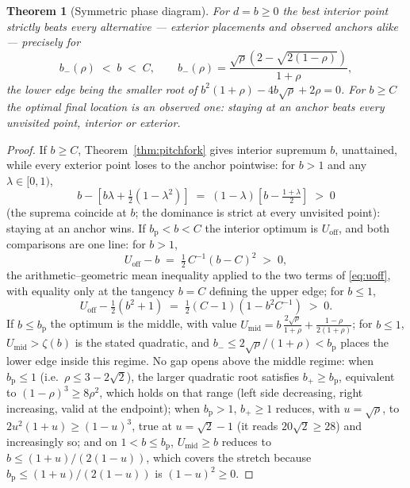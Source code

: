 \documentclass[11pt]{article}
\theoremstyle{itheads}
\newtheorem{theorem}{Theorem}
\begin{document}
\begin{theorem}[Symmetric phase diagram]\label{thm:boundary}
For $d=b\ge 0$ the best interior point strictly beats every
alternative --- exterior placements and observed anchors alike ---
precisely for
\begin{equation}\label{eq:region}
b_{-}(\rho) \;<\; b \;<\; C,
\qquad
b_{-}(\rho)=\frac{\sqrt{\rho}\left(2-\sqrt{2\left(1-\rho\right)}\right)}{1+\rho},
\end{equation}
the lower edge being the smaller root of
$b^{2}\left(1+\rho\right)-4b\sqrt{\rho}+2\rho=0$. For
$b\ge C$ the optimal final location is an \emph{observed}
one: staying at an anchor beats every unvisited point, interior or
exterior.
\end{theorem}

\begin{proof}
If $b\ge C$, Theorem~\ref{thm:pitchfork} gives interior
supremum $b$, unattained, while every exterior point loses to the
anchor pointwise: for $b>1$ and any $\lambda\in[0,1)$,
\begin{equation}
b-\left[b\lambda+\tfrac12\left(1-\lambda^{2}\right)\right]
\;=\;\left(1-\lambda\right)\!\left[b-\tfrac{1+\lambda}{2}\right]
\;>\;0
\end{equation}
(the suprema coincide at $b$; the dominance is strict at every
unvisited point): staying at an anchor wins. If $b_{\mathrm p}<b<C$ the interior optimum
is $U_{\mathrm{off}}$, and both comparisons are one line: for $b>1$,
\begin{equation}
U_{\mathrm{off}} - b \;=\;
\tfrac12\,C^{-1}\!\left(b-C\right)^{2} \;>\;0,
\end{equation}
the arithmetic--geometric mean inequality applied to the two terms of
\eqref{eq:uoff}, with equality only at the tangency $b=C$
defining the upper edge; for $b\le 1$,
\begin{equation}
U_{\mathrm{off}} - \tfrac12\!\left(b^{2}+1\right) \;=\;
\tfrac12\!\left(C-1\right)\!\left(1-b^{2}C^{-1}\right)
\;>\;0 .
\end{equation}
If $b\le b_{\mathrm p}$ the optimum is the middle, with value
$U_{\mathrm{mid}}=b\,\tfrac{2\sqrt{\rho}}{1+\rho}
+\tfrac{1-\rho}{2\left(1+\rho\right)}$; for $b\le 1$,
$U_{\mathrm{mid}}>\zeta(b)$ is the stated quadratic, and
$b_{-}\le 2\sqrt{\rho}/\left(1+\rho\right)<b_{\mathrm p}$ places the
lower edge inside this regime. No gap opens above the middle regime:
when $b_{\mathrm p}\le 1$ (i.e.\ $\rho\le 3-2\sqrt{2}$), the larger
quadratic root satisfies $b_{+}\ge b_{\mathrm p}$, equivalent to
$\left(1-\rho\right)^{3}\ge 8\rho^{2}$, which holds on that range
(left side decreasing, right increasing, valid at the endpoint);
when $b_{\mathrm p}>1$, $b_{+}\ge 1$ reduces, with $u=\sqrt{\rho}$, to
$2u^{2}\left(1+u\right)\ge\left(1-u\right)^{3}$, true at
$u=\sqrt{2}-1$ (it reads $20\sqrt{2}\ge 28$) and increasingly so; and
on $1<b\le b_{\mathrm p}$, $U_{\mathrm{mid}}\ge b$ reduces to
$b\le\left(1+u\right)/\left(2\left(1-u\right)\right)$, which covers
the stretch because $b_{\mathrm p}\le
\left(1+u\right)/\left(2\left(1-u\right)\right)$ is
$\left(1-u\right)^{2}\ge 0$.
\end{proof}
\end{document}
